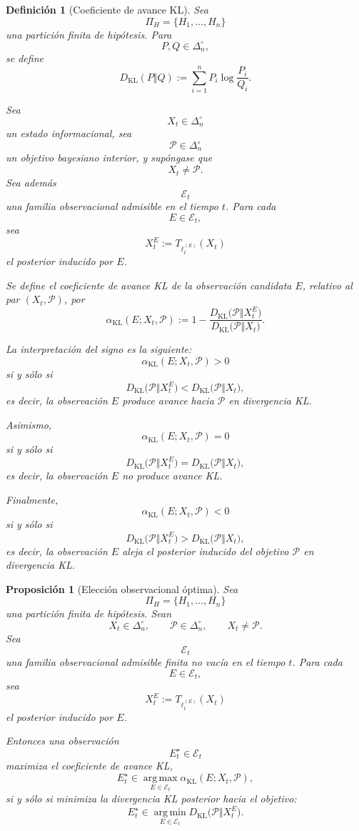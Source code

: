 \documentclass[12pt]{article}
\newtheorem{definicion}{Definición}[section]
\newtheorem{proposicion}{Proposición}[section]
\begin{document}
\begin{definicion}[Coeficiente de avance KL]
Sea
\[
\Pi_H=\{H_1,\dots,H_n\}
\]
una partición finita de hipótesis. Para
\[
P,Q\in\Delta_n^\circ,
\]
se define
\[
D_{\mathrm{KL}}(P\Vert Q)
:=
\sum_{i=1}^n P_i\log\frac{P_i}{Q_i}.
\]

Sea
\[
X_t\in\Delta_n^\circ
\]
un estado informacional, sea
\[
\mathcal P\in\Delta_n^\circ
\]
un objetivo bayesiano interior, y supóngase que
\[
X_t\neq \mathcal P.
\]
Sea además
\[
\mathcal E_t
\]
una familia observacional admisible en el tiempo \(t\). Para cada
\[
E\in\mathcal E_t,
\]
sea
\[
X_t^E:=T_{\ell_t^{(E)}}(X_t)
\]
el posterior inducido por \(E\).

Se define el \emph{coeficiente de avance KL} de la observación candidata \(E\), relativo al par \((X_t,\mathcal P)\), por
\[
\alpha_{\mathrm{KL}}(E;X_t,\mathcal P)
:=
1-
\frac{
D_{\mathrm{KL}}\bigl(\mathcal P\Vert X_t^E\bigr)
}{
D_{\mathrm{KL}}\bigl(\mathcal P\Vert X_t\bigr)
}.
\]

La interpretación del signo es la siguiente:
\[
\alpha_{\mathrm{KL}}(E;X_t,\mathcal P)>0
\]
si y sólo si
\[
D_{\mathrm{KL}}\bigl(\mathcal P\Vert X_t^E\bigr)
<
D_{\mathrm{KL}}\bigl(\mathcal P\Vert X_t\bigr),
\]
es decir, la observación \(E\) produce avance hacia \(\mathcal P\) en divergencia KL.

Asimismo,
\[
\alpha_{\mathrm{KL}}(E;X_t,\mathcal P)=0
\]
si y sólo si
\[
D_{\mathrm{KL}}\bigl(\mathcal P\Vert X_t^E\bigr)
=
D_{\mathrm{KL}}\bigl(\mathcal P\Vert X_t\bigr),
\]
es decir, la observación \(E\) no produce avance KL.

Finalmente,
\[
\alpha_{\mathrm{KL}}(E;X_t,\mathcal P)<0
\]
si y sólo si
\[
D_{\mathrm{KL}}\bigl(\mathcal P\Vert X_t^E\bigr)
>
D_{\mathrm{KL}}\bigl(\mathcal P\Vert X_t\bigr),
\]
es decir, la observación \(E\) aleja el posterior inducido del objetivo \(\mathcal P\) en divergencia KL.
\end{definicion}


\begin{proposicion}[Elección observacional óptima]
Sea
\[
\Pi_H=\{H_1,\dots,H_n\}
\]
una partición finita de hipótesis. Sean
\[
X_t\in\Delta_n^\circ,
\qquad
\mathcal P\in\Delta_n^\circ,
\qquad
X_t\neq \mathcal P.
\]
Sea
\[
\mathcal E_t
\]
una familia observacional admisible finita no vacía en el tiempo \(t\). Para cada
\[
E\in\mathcal E_t,
\]
sea
\[
X_t^E:=T_{\ell_t^{(E)}}(X_t)
\]
el posterior inducido por \(E\).

Entonces una observación
\[
E_t^\star\in\mathcal E_t
\]
maximiza el coeficiente de avance KL,
\[
E_t^\star
\in
\operatorname*{arg\,max}_{E\in\mathcal E_t}
\alpha_{\mathrm{KL}}(E;X_t,\mathcal P),
\]
si y sólo si minimiza la divergencia KL posterior hacia el objetivo:
\[
E_t^\star
\in
\operatorname*{arg\,min}_{E\in\mathcal E_t}
D_{\mathrm{KL}}\bigl(\mathcal P\Vert X_t^E\bigr).
\]
\end{proposicion}
\end{document}
